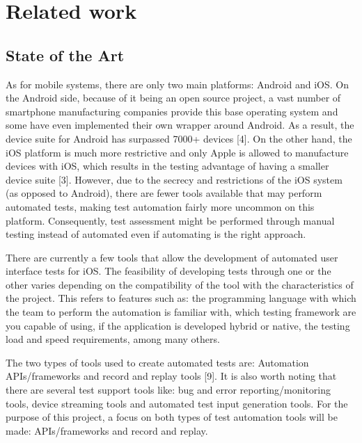 %
\chapter{Related work}
\label{chapter2}

\section{State of the Art}

As for mobile systems, there are only two main platforms: Android and iOS. On the Android side, because of it being an open source project, a vast number of smartphone manufacturing companies provide this base operating system and some have even implemented their own wrapper around Android. As a result, the device suite for Android has surpassed 7000+ devices [4]. On the other hand, the iOS platform is much more restrictive and only Apple is allowed to manufacture devices with iOS, which results in the testing advantage of having a smaller device suite [3]. However, due to the secrecy and restrictions of the iOS system (as opposed to Android), there are fewer tools available that may perform automated tests, making test automation fairly more uncommon on this platform. Consequently, test assessment might be performed through manual testing instead of automated even if automating is the right approach.

There are currently a few tools that allow the development of automated user interface tests for iOS. The feasibility of developing tests through one or the other varies depending on the compatibility of the tool with the characteristics of the project. This refers to features such as: the programming language with which the team to perform the automation is familiar with, which testing framework are you capable of using, if the application is developed hybrid or native, the testing load and speed requirements, among many others.

The two types of tools used to create automated tests are: Automation APIs/frameworks and record and replay tools [9]. It is also worth noting that there are several test support tools like: bug and error reporting/monitoring tools, device streaming tools and automated test input generation tools. For the purpose of this project, a focus on both types of test automation tools will be made: APIs/frameworks and record and replay.

